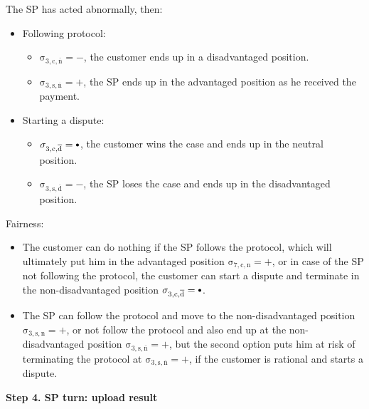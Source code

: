 \documentclass{ieeeaccess}
\newcommand\sbullet[1][.75]{\mathbin{\ThisStyle{\vcenter{\hbox{%
  \scalebox{#1}{$\SavedStyle\bullet$}}}}}%
}
\begin{document}
The SP has acted abnormally, then:

\begin{itemize}
\item
  Following protocol:

  \begin{itemize}
  
  \item
    \(\operatorname{\sigma_{3, c, \overline{n}} = -}\), the customer ends up in a disadvantaged position.
  \item
    \(\operatorname{\sigma_{3, s, \overline{n}} = +}\), the SP ends up in the advantaged position as he received the payment. 
  \end{itemize}
\item
  Starting a dispute:

  \begin{itemize}
  
  \item
    \(\operatorname{\sigma_{3, c, \overline{d}} = \sbullet}\), the customer wins the case and ends up in the neutral position.
  \item
    \(\operatorname{\sigma_{3, s, \overline{d}} = -}\), the SP loses the case and ends up in the disadvantaged position. 
  \end{itemize}
\end{itemize}

Fairness:

\begin{itemize}

\item
  The customer can do nothing if the SP follows the protocol, which will ultimately put him in the advantaged position \(\operatorname{\sigma_{7, c, n} = +}\), or in case of the SP not following the protocol, the customer can start a dispute and terminate in the non-disadvantaged position \(\operatorname{\sigma_{3, c, \overline{d}} = \sbullet}\).
\item
  The SP can follow the protocol and move to the non-disadvantaged position \(\operatorname{\sigma_{3, s, n} = +}\), or not follow the protocol and also end up at the non-disadvantaged position \(\operatorname{\sigma_{3, s, \overline{n}} = +}\), but the second option puts him at risk of terminating the protocol at \(\operatorname{\sigma_{3, s, \overline{n}} = +}\), if the customer is rational and starts a dispute.
\end{itemize}

\noindent \textbf
{Step 4. SP turn: upload result}\label{step-4-publication-of-results}
\end{document}
